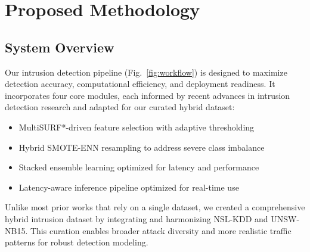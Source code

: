 \documentclass[conference]{IEEEtran}
\begin{document}
\section{Proposed Methodology}

\subsection{System Overview}
Our intrusion detection pipeline (Fig.~\ref{fig:workflow}) is designed to maximize detection accuracy, computational efficiency, and deployment readiness. It incorporates four core modules, each informed by recent advances in intrusion detection research and adapted for our curated hybrid dataset:
\begin{itemize}
    \item MultiSURF*-driven feature selection with adaptive thresholding
    \item Hybrid SMOTE-ENN resampling to address severe class imbalance
    \item Stacked ensemble learning optimized for latency and performance
    \item Latency-aware inference pipeline optimized for real-time use
\end{itemize}

Unlike most prior works that rely on a single dataset, we created a comprehensive hybrid intrusion dataset by integrating and harmonizing NSL-KDD and UNSW-NB15. This curation enables broader attack diversity and more realistic traffic patterns for robust detection modeling.
\end{document}
